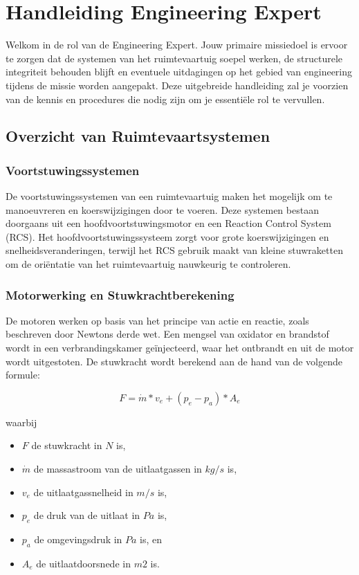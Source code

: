 \section{Handleiding Engineering Expert}

Welkom in de rol van de Engineering Expert. Jouw primaire missiedoel is ervoor te zorgen dat de systemen van het ruimtevaartuig soepel werken, de structurele integriteit behouden blijft en eventuele uitdagingen op het gebied van engineering tijdens de missie worden aangepakt. Deze uitgebreide handleiding zal je voorzien van de kennis en procedures die nodig zijn om je essentiële rol te vervullen.

\subsection{Overzicht van Ruimtevaartsystemen}

\subsubsection{Voortstuwingssystemen}
De voortstuwingssystemen van een ruimtevaartuig maken het mogelijk om te manoeuvreren en koerswijzigingen door te voeren. Deze systemen bestaan doorgaans uit een hoofdvoortstuwingsmotor en een Reaction Control System (RCS). Het hoofdvoortstuwingssysteem zorgt voor grote koerswijzigingen en snelheidsveranderingen, terwijl het RCS gebruik maakt van kleine stuwraketten om de oriëntatie van het ruimtevaartuig nauwkeurig te controleren.

\subsubsection{Motorwerking en Stuwkrachtberekening}
De motoren werken op basis van het principe van actie en reactie, zoals beschreven door Newtons derde wet. Een mengsel van oxidator en brandstof wordt in een verbrandingskamer geïnjecteerd, waar het ontbrandt en uit de motor wordt uitgestoten. De stuwkracht wordt berekend aan de hand van de volgende formule:

$$F=\dot{m}*v_e + (p_e-p_a) * A_e$$

waarbij
\begin{itemize}
    \item $F$ de stuwkracht in $N$ is,
    \item $\dot{m}$ de massastroom van de uitlaatgassen in $kg/s$ is,
    \item $v_e$ de uitlaatgassnelheid in $m/s$ is,
    \item $p_e$ de druk van de uitlaat in $Pa$ is,
    \item $p_a$ de omgevingsdruk in $Pa$ is, en
    \item $A_e$ de uitlaatdoorsnede in $m2$ is.
\end{itemize}


